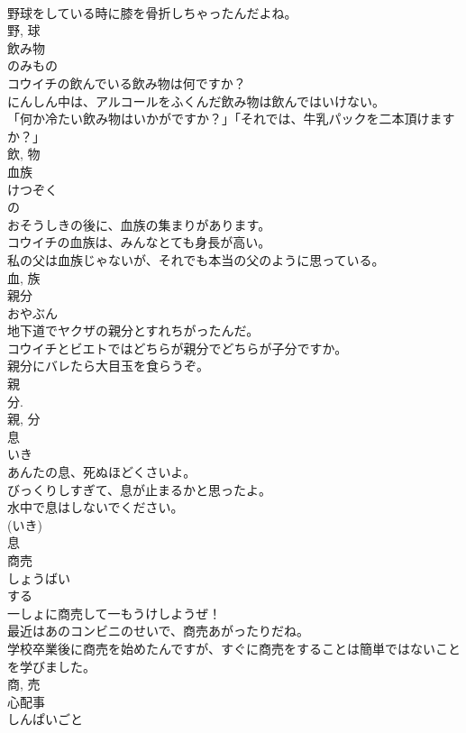 \documentclass[8pt]{extreport}
\begin{document}
\begin{CJK}{UTF8}{min}
\\	野球をしている時に膝を骨折しちゃったんだよね。	
\\	野, 球	
\\	飲み物	
\\	のみもの	
\\	コウイチの飲んでいる飲み物は何ですか？	
\\	にんしん中は、アルコールをふくんだ飲み物は飲んではいけない。	
\\	「何か冷たい飲み物はいかがですか？」「それでは、牛乳パックを二本頂けますか？」	
\\	飲, 物	
\\	血族	
\\	けつぞく	
\\	の 
\\	おそうしきの後に、血族の集まりがあります。	
\\	コウイチの血族は、みんなとても身長が高い。	
\\	私の父は血族じゃないが、それでも本当の父のように思っている。	
\\	血, 族	
\\	親分	
\\	おやぶん	
\\	地下道でヤクザの親分とすれちがったんだ。	
\\	コウイチとビエトではどちらが親分でどちらが子分ですか。	
\\	親分にバレたら大目玉を食らうぞ。	
\\	親 
\\	分. 
\\	親, 分	
\\	息	
\\	いき	
\\	あんたの息、死ぬほどくさいよ。	
\\	びっくりしすぎて、息が止まるかと思ったよ。	
\\	水中で息はしないでください。	
\\	(いき) 
\\	息	
\\	商売	
\\	しょうばい	
\\	する 
\\	一しょに商売して一もうけしようぜ！	
\\	最近はあのコンビニのせいで、商売あがったりだね。	
\\	学校卒業後に商売を始めたんですが、すぐに商売をすることは簡単ではないことを学びました。	
\\	商, 売	
\\	心配事	
\\	しんぱいごと	

\end{CJK}
\end{document}
